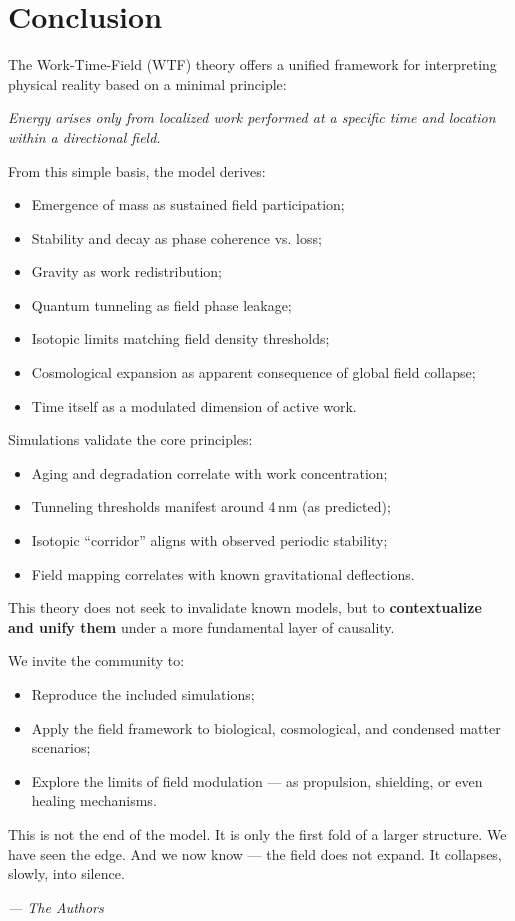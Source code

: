 \section{Conclusion}

The Work-Time-Field (WTF) theory offers a unified framework for interpreting physical reality based on a minimal principle:

\begin{center}
\textit{Energy arises only from localized work performed at a specific time and location within a directional field.}
\end{center}

From this simple basis, the model derives:

\begin{itemize}
    \item Emergence of mass as sustained field participation;
    \item Stability and decay as phase coherence vs. loss;
    \item Gravity as work redistribution;
    \item Quantum tunneling as field phase leakage;
    \item Isotopic limits matching field density thresholds;
    \item Cosmological expansion as apparent consequence of global field collapse;
    \item Time itself as a modulated dimension of active work.
\end{itemize}

Simulations validate the core principles:
\begin{itemize}
    \item Aging and degradation correlate with work concentration;
    \item Tunneling thresholds manifest around 4\,nm (as predicted);
    \item Isotopic “corridor” aligns with observed periodic stability;
    \item Field mapping correlates with known gravitational deflections.
\end{itemize}

\vspace{10pt}
This theory does not seek to invalidate known models, but to \textbf{contextualize and unify them} under a more fundamental layer of causality.

We invite the community to:
\begin{itemize}
    \item Reproduce the included simulations;
    \item Apply the field framework to biological, cosmological, and condensed matter scenarios;
    \item Explore the limits of field modulation — as propulsion, shielding, or even healing mechanisms.
\end{itemize}

\noindent This is not the end of the model.  
It is only the first fold of a larger structure.  
We have seen the edge.  
And we now know — the field does not expand.  
It collapses, slowly, into silence.  

\vspace{10pt}
\textit{— The Authors}
